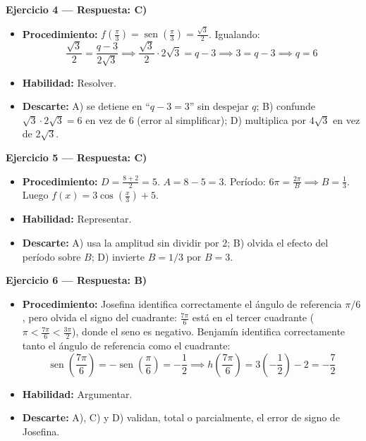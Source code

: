 \documentclass[12pt,letterpaper]{article}
\providecommand{\sen}{\operatorname{sen}}
\begin{document}
\vspace{1.2cm}

\textbf{Ejercicio 4 --- Respuesta: C)}
\begin{itemize}[leftmargin=*]
    \item \textbf{Procedimiento:} $f\left(\frac{\pi}{3}\right)=\sen\left(\frac{\pi}{3}\right)=\frac{\sqrt3}{2}$. Igualando:
          \[ \frac{\sqrt3}{2}=\frac{q-3}{2\sqrt3} \implies \frac{\sqrt3}{2}\cdot2\sqrt3=q-3 \implies 3=q-3 \implies q=6 \]
    \item \textbf{Habilidad:} Resolver.
    \item \textbf{Descarte:} A) se detiene en ``$q-3=3$'' sin despejar $q$; B) confunde $\sqrt3\cdot2\sqrt3=6$ en vez de $6$ (error al simplificar); D) multiplica por $4\sqrt3$ en vez de $2\sqrt3$.
\end{itemize}

\vspace{1.2cm}
\newpage
\textbf{Ejercicio 5 --- Respuesta: C)}
\begin{itemize}[leftmargin=*]
    \item \textbf{Procedimiento:} $D=\frac{8+2}{2}=5$. $A=8-5=3$. Período: $6\pi=\frac{2\pi}{B}\implies B=\frac13$. Luego $f(x)=3\cos\left(\frac{x}{3}\right)+5$.
    \item \textbf{Habilidad:} Representar.
    \item \textbf{Descarte:} A) usa la amplitud sin dividir por $2$; B) olvida el efecto del período sobre $B$; D) invierte $B=1/3$ por $B=3$.
\end{itemize}


\textbf{Ejercicio 6 --- Respuesta: B)}
\begin{itemize}[leftmargin=*]
    \item \textbf{Procedimiento:} Josefina identifica correctamente el ángulo de referencia $\pi/6$, pero olvida el signo del cuadrante: $\frac{7\pi}{6}$ está en el tercer cuadrante ($\pi<\frac{7\pi}{6}<\frac{3\pi}{2}$), donde el seno es negativo. Benjamín identifica correctamente tanto el ángulo de referencia como el cuadrante:
          \[ \sen\left(\frac{7\pi}{6}\right)=-\sen\left(\frac{\pi}{6}\right)=-\frac12 \implies h\left(\frac{7\pi}{6}\right)=3\left(-\frac12\right)-2=-\frac72 \]
    \item \textbf{Habilidad:} Argumentar.
    \item \textbf{Descarte:} A), C) y D) validan, total o parcialmente, el error de signo de Josefina.
\end{itemize}
\end{document}
